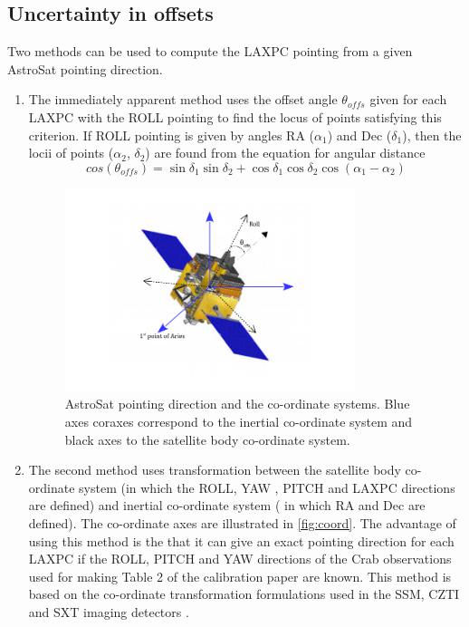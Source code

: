 \documentclass[11pt,a4paper,eulermath,pdfspacing]{article} %
\begin{document}
\subsection{Uncertainty in offsets}
Two methods can be used to compute the LAXPC pointing from a given AstroSat
pointing direction.
\begin{enumerate}
	\item The immediately apparent method uses the offset angle $\theta_{offs}$
		given for each LAXPC with the ROLL pointing to find the locus of points
		satisfying this criterion. If ROLL pointing is given by angles RA
		($\alpha_1$) and Dec ($\delta_1$), then the locii of points
		($\alpha_2$, $\delta_2$) are found from the equation for angular distance
		\begin{equation}
			cos(\theta_{offs}) = \sin{\delta_1}\sin{\delta_2} +
			\cos{\delta_1}\cos{\delta_2}\cos{(\alpha_1 - \alpha_2)}
			\label{eqn:diff}
		\end{equation}

\begin{figure}[!h]
  \centering
  \includegraphics[width=0.8\textwidth]{./AstroSat_pntng.pdf}
  \caption{AstroSat pointing direction and the co-ordinate systems. Blue axes
  coraxes correspond to the inertial co-ordinate system and black axes to the
  satellite body co-ordinate system.}
  \label{fig:coord}
\end{figure}


	\item The second method uses transformation between the satellite body
		co-ordinate system (in which the ROLL, YAW , PITCH and LAXPC directions
		are defined) and inertial co-ordinate system ( in which RA and Dec are
		defined). The co-ordinate axes are illustrated in \autoref{fig:coord}. 
		The advantage of using this method is the that it can give an exact
		pointing direction for each LAXPC if the ROLL, PITCH and YAW directions
		of the Crab observations used for making Table 2 of the calibration
		paper are known. This method is based on the co-ordinate transformation
		formulations used in the SSM, CZTI and SXT imaging detectors
		\citep{dip1,dip2}.


\end{enumerate}
\end{document}
